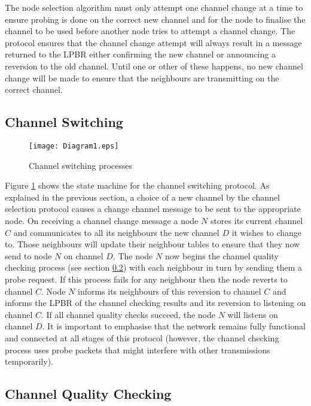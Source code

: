 The node selection algorithm must only attempt one channel change at a time to ensure probing is done on the correct new channel and for the node to finalise the channel to be used before another node tries to attempt a channel change.
The protocol ensures that the channel change attempt will always result in a message returned to the LPBR either confirming the new channel or announcing a reversion to the old channel. Until one or other of these happens, no new channel change will be made to ensure that the neighbours are transmitting on the correct channel.

\subsection{Channel Switching}
\label{sec:channelswitch}

\begin{figure}
\centering
\texttt{[image: Diagram1.eps]}
\caption{Channel switching processes}
\label{fig_sim}
\end{figure}

Figure \ref{fig_sim} shows the state machine for the channel switching protocol.
As explained in the previous section, a choice of a new channel by the channel selection protocol causes a change channel message to be sent to the appropriate node. 
On receiving a channel change message a node $N$ stores its current channel $C$ and communicates to all its neighbours the new channel $D$ it wishes to change to.  Those neighbours will update their neighbour tables to ensure that they now send to node $N$ on channel $D$.  The node $N$ now begins the channel quality checking process (see section \ref{sec:channelquality}) with each neighbour in turn by sending them a probe request.  If this process fails for any neighbour then the node reverts to channel $C$.  Node $N$ informs its neighbours of this reversion to channel $C$ and informs the LPBR of the channel checking results and its reversion to listening on channel $C$. If all channel quality checks succeed, the node $N$ will listens on channel $D$. It is important to emphasise that the network remains fully functional and connected at all stages of this protocol (however, the channel checking process uses probe packets that might interfere with other transmissions temporarily).

\subsection{Channel Quality Checking}
\label{sec:channelquality}


